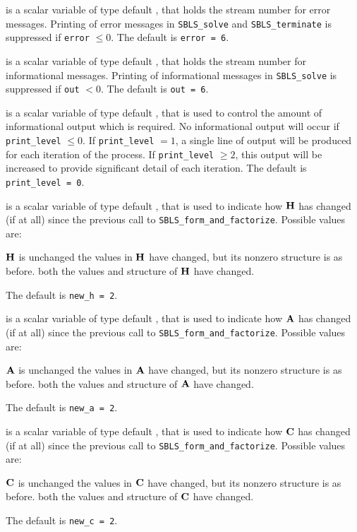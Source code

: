 \documentclass{galahad}
\newcommand{\packagename}{SBLS}
\begin{document}
\begin{description}

 is a scalar variable of type default \integer, that holds the
stream number for error messages. Printing of error messages in 
{\tt \packagename\_solve} and {\tt \packagename\_terminate} 
is suppressed if {\tt error} $\leq 0$.
The default is {\tt error = 6}.

 is a scalar variable of type default \integer, that holds the
stream number for informational messages. Printing of informational messages in 
{\tt \packagename\_solve} is suppressed if {\tt out} $< 0$.
The default is {\tt out = 6}.

 is a scalar variable of type default \integer, that is used
to control the amount of informational output which is required. No 
informational output will occur if {\tt print\_level} $\leq 0$. If 
{\tt print\_level} $= 1$, a single line of output will be produced for each
iteration of the process. If {\tt print\_level} $\geq 2$, this output will be
increased to provide significant detail of each iteration.
The default is {\tt print\_level = 0}.

 is a scalar variable of type default \integer, that is used
to indicate how ${\mathbf{H}}$ has changed (if at all) since the previous call
to {\tt SBLS\_form\_and\_factorize}. Possible values are:
\begin{description}
 ${\mathbf{H}}$ is unchanged
 the values in ${\mathbf{H}}$ have changed, but its nonzero structure 
is as before.
 both the values and structure of ${\mathbf{H}}$ have changed.
\end{description}
The default is {\tt new\_h = 2}.

 is a scalar variable of type default \integer, that is used
to indicate how ${\mathbf{A}}$ has changed (if at all) since the previous call
to {\tt SBLS\_form\_and\_factorize}. Possible values are:
\begin{description}
 ${\mathbf{A}}$ is unchanged
 the values in ${\mathbf{A}}$ have changed, but its nonzero structure 
is as before.
 both the values and structure of ${\mathbf{A}}$ have changed.
\end{description}
The default is {\tt new\_a = 2}.

 is a scalar variable of type default \integer, that is used
to indicate how ${\mathbf{C}}$ has changed (if at all) since the previous call
to {\tt SBLS\_form\_and\_factorize}. Possible values are:
\begin{description}
 ${\mathbf{C}}$ is unchanged
 the values in ${\mathbf{C}}$ have changed, but its nonzero structure 
is as before.
 both the values and structure of ${\mathbf{C}}$ have changed.
\end{description}
The default is {\tt new\_c = 2}.


\end{description}
\end{document}
